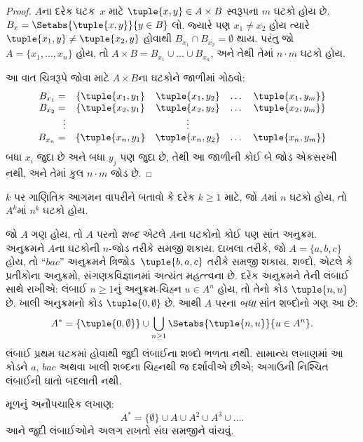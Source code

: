 \begin{proof}
$A$ના દરેક ઘટક~$x$ માટે $\tuple{x, y} \in A \times B$
સ્વરૂપના $m$ ઘટકો હોય છે.
$B_x = \Setabs{\tuple{x, y}}{y \in B}$ લો.
જ્યારે પણ $x_1 \neq x_2$ હોય ત્યારે $\tuple{x_1, y} \neq \tuple{x_2, y}$
હોવાથી $B_{x_1} \cap B_{x_2} = \emptyset$ થાય.
પરંતુ જો $A = \{x_1, \dots, x_n\}$ હોય, તો
$A \times B = B_{x_1} \cup \dots \cup B_{x_n}$,
અને તેથી તેમાં $n\cdot m$ ઘટકો હોય.

આ વાત ચિત્રરૂપે જોવા માટે $A \times B$ના ઘટકોને જાળીમાં ગોઠવો:
\[
\begin{array}{rcccc}
  B_{x_1} = & \{\tuple{x_1, y_1} & \tuple{x_1, y_2} & \dots & \tuple{x_1, y_m}\}\\
  B_{x_2} = & \{\tuple{x_2, y_1} & \tuple{x_2, y_2} & \dots & \tuple{x_2, y_m}\}\\
  \vdots & & \vdots\\
  B_{x_n} = & \{\tuple{x_n, y_1} & \tuple{x_n, y_2} & \dots & \tuple{x_n, y_m}\}
\end{array}
\]
બધા $x_i$ જુદા છે અને બધા $y_j$ પણ જુદા છે, તેથી આ જાળીની કોઈ બે જોડ
એકસરખી નથી, અને તેમાં કુલ $n\cdot m$ જોડ છે.
\end{proof}

\begin{prob}
$k$ પર ગાણિતિક આગમન વાપરીને બતાવો કે દરેક $k \ge 1$ માટે,
જો $A$માં $n$ ઘટકો હોય, તો $A^k$માં $n^k$ ઘટકો હોય.
\end{prob}

\begin{ex}
જો $A$ ગણ હોય, તો $A$ પરનો \emph{શબ્દ} એટલે $A$ના ઘટકોનો
કોઈ પણ સાંત અનુક્રમ. અનુક્રમને $A$ના ઘટકોની $n$-જોડ તરીકે સમજી શકાય.
દાખલા તરીકે, જો $A = \{a, b, c\}$ હોય, તો “$bac$” અનુક્રમને
ત્રિજોડ~$\tuple{b, a, c}$ તરીકે સમજી શકાય.
શબ્દો, એટલે કે પ્રતીકોના અનુક્રમો, સંગણકવિજ્ઞાનમાં અત્યંત મહત્ત્વના છે.
દરેક અનુક્રમને તેની લંબાઈ સાથે રાખીએ: લંબાઈ $n\ge1$નું
અનુક્રમ-ચિહ્ન $u\in A^n$ હોય, તો તેનો કોડ $\tuple{n,u}$ છે.
ખાલી અનુક્રમનો કોડ $\tuple{0,\emptyset}$ છે.
આથી $A$ પરના \emph{બધા} સાંત શબ્દોનો ગણ આ છે:
\[
A^* = \{\tuple{0,\emptyset}\}
\cup \bigcup_{n\ge1}\Setabs{\tuple{n,u}}{u\in A^n}.
\]
લંબાઈ પ્રથમ ઘટકમાં હોવાથી જુદી લંબાઈના શબ્દો ભળતા નથી.
સામાન્ય લખાણમાં આ કોડને $a$, $bac$ અથવા ખાલી શબ્દના
ચિહ્નથી જ દર્શાવીએ છીએ; અગાઉની નિશ્ચિત લંબાઈની ઘાતો બદલાતી નથી.
\begin{editorial}
મૂળનું અનૌપચારિક લખાણ:
\[
A^* = \{\emptyset\} \cup A \cup A^2 \cup A^3 \cup \dots.
\]
આને જુદી લંબાઈઓને અલગ રાખતો સંઘ સમજીને વાંચવું.
\end{editorial}
\end{ex}
\endgroup


